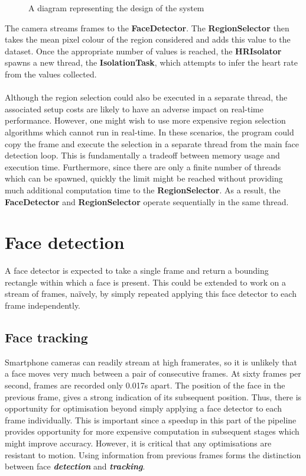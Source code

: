 \begin{figure}[!h]
    
   \caption{A diagram representing the design of the system} 
\end{figure}
\noindent
The camera streams frames to the \textbf{FaceDetector}. The \textbf{RegionSelector} then takes the mean pixel colour of the region considered and adds this value to the dataset. Once the appropriate number of values is reached, the \textbf{HRIsolator} spawns a new thread, the \textbf{IsolationTask}, which attempts to infer the heart rate from the values collected. 
\\ \\
Although the region selection could also be executed in a separate thread, the associated setup costs are likely to have an adverse impact on real-time performance. However, one might wish to use more expensive region selection algorithms which cannot run in real-time. In these scenarios, the program could copy the frame and execute the selection in a separate thread from the main face detection loop. This is fundamentally a tradeoff between memory usage and execution time. Furthermore, since there are only a finite number of threads which can be spawned, quickly the limit might be reached without providing much additional computation time to the \textbf{RegionSelector}. As a result, the \textbf{FaceDetector} and \textbf{RegionSelector} operate sequentially in the same thread.
\section{Face detection}
A face detector is expected to take a single frame and return a bounding rectangle within which a face is present. This could be extended to work on a stream of frames, naïvely, by simply repeated applying this face detector to each frame independently.

\subsection{Face tracking}
Smartphone cameras can readily stream at high framerates, so it is unlikely that a face moves very much between a pair of consecutive frames. At sixty frames per second, frames are recorded only 0.017s apart. The position of the face in the previous frame, gives a strong indication of its subsequent position. Thus, there is opportunity for optimisation beyond simply applying a face detector to each frame individually. This is important since a speedup in this part of the pipeline provides opportunity for more expensive computation in subsequent stages which might improve accuracy. However, it is critical that any optimisations are resistant to motion. Using information from previous frames forms the distinction between face \textbf{\textit{detection}} and \textbf{\textit{tracking}}.

